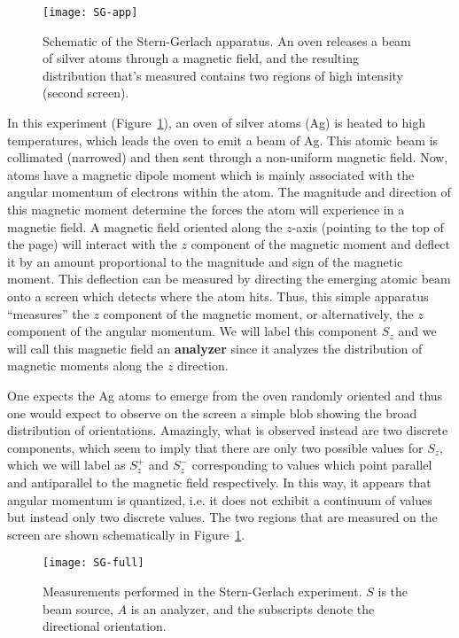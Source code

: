 \begin{figure}[!h]
	\centering
	\texttt{[image: SG-app]}
	\caption{Schematic of the Stern-Gerlach apparatus. An oven releases a beam of silver atoms through a magnetic field, and the resulting distribution that's measured contains two regions of high intensity (second screen).}
	\label{fig:SG-app}
\end{figure}

In this experiment (Figure~\ref{fig:SG-app}), an oven of silver atoms (Ag) is heated to high temperatures, which leads the oven to emit a beam of Ag. This atomic beam is collimated (narrowed) and then sent through a non-uniform magnetic field. Now, atoms have a magnetic dipole moment which is mainly associated with the angular momentum of electrons within the atom. The magnitude and direction of this magnetic moment determine the forces the atom will experience in a magnetic field. A magnetic field oriented along the $z$-axis (pointing to the top of the page) will interact with the $z$ component of the magnetic moment and deflect it by an amount proportional to the magnitude and sign of the magnetic moment. This deflection can be measured by directing the emerging atomic beam onto a screen which detects where the atom hits. Thus, this simple apparatus ``measures'' the $z$ component of the magnetic moment, or alternatively, the $z$ component of the angular momentum. We will label this component $S_z$ and we will call this magnetic field an \textbf{analyzer} since it analyzes the distribution of magnetic moments along the $z$ direction. \par

One expects the Ag atoms to emerge from the oven randomly oriented and thus one would expect to observe on the screen a simple blob showing the broad distribution of orientations. Amazingly, what is observed instead are two discrete components, which seem to imply that there are only two possible values for $S_z$, which we will label as $S_z^+$ and $S_z^-$ corresponding to values which point parallel and antiparallel to the magnetic field respectively. In this way, it appears that angular momentum is quantized, i.e. it does not exhibit a continuum of values but instead only two discrete values. The two regions that are measured on the screen are shown schematically in Figure~\ref{fig:SG-app}. \par

\begin{figure}[!h]
	\centering
	\texttt{[image: SG-full]}
	\caption{Measurements performed in the Stern-Gerlach experiment. $S$ is the beam source, $A$ is an analyzer, and the subscripts denote the directional orientation.}
	\label{fig:SG-full}
\end{figure}

